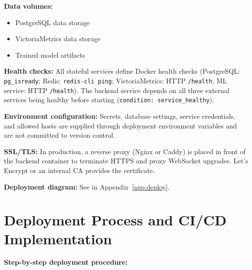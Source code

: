 \textbf{Data volumes:}
\begin{itemize}
  \item PostgreSQL data storage
  \item VictoriaMetrics data storage
  \item Trained model artifacts
\end{itemize}

\textbf{Health checks:} All stateful services define Docker health checks
(PostgreSQL: \texttt{pg\_isready}; Redis: \texttt{redis-cli ping};
VictoriaMetrics: HTTP \texttt{/health}; ML service: HTTP \texttt{/health}).
The backend service depends on all three external services being healthy
before starting (\texttt{condition: service\_healthy}).

\textbf{Environment configuration:} Secrets, database settings, service
credentials, and allowed hosts are supplied through deployment environment
variables and are not committed to version control.

\textbf{SSL/TLS:} In production, a reverse proxy (Nginx or Caddy) is placed
in front of the backend container to terminate HTTPS and proxy WebSocket
upgrades.  Let's Encrypt or an internal CA provides the certificate.

\textbf{Deployment diagram:} See  in Appendix~\ref{app:deploy}.

\section{Deployment Process and CI/CD Implementation}

\textbf{Step-by-step deployment procedure:}

